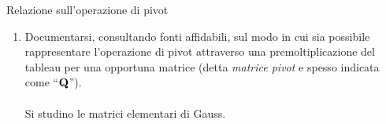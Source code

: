 \documentclass{beamer}
\begin{document}
\generatitolo


\begin{frame}{Relazione sull'operazione di pivot}

    \begin{enumerate}
    
     \item Documentarsi, consultando fonti affidabili, sul modo
     in cui sia possibile rappresentare l'operazione di pivot
     attraverso una premoltiplicazione del tableau per una
     opportuna matrice (detta \emph{matrice pivot} e spesso indicata
     come ``$\mathbf{Q}$'').\\~\\
     Si studino le matrici elementari di Gauss.\\~\\
    \end{enumerate}
\end{frame}
\end{document}
